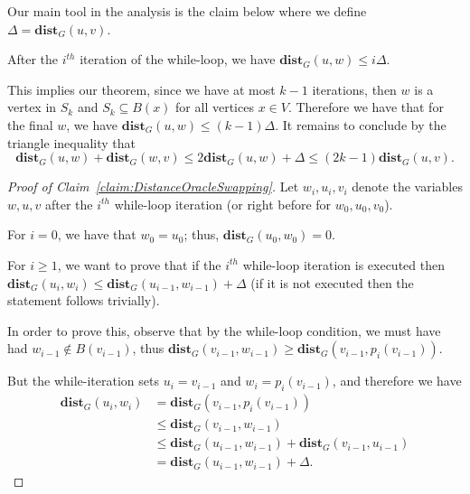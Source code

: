 Our main tool in the analysis is the claim below where we define $\Delta = \mathbf{dist}_G(u,v)$. 

\begin{claim}\label{claim:DistanceOracleSwapping} After the $i^{th}$ iteration of the while-loop, we have $\mathbf{dist}_G(u,w) \leq i\Delta$.
\end{claim}

This implies our theorem, since we have at most $k-1$ iterations, then $w$ is a vertex in $S_k$ and $S_k \subseteq B(x)$ for all vertices $x \in V$. Therefore we have that for the final $w$, we have $\mathbf{dist}_G(u,w) \leq (k-1)\Delta$. It remains to conclude by the triangle inequality that 
\[
\mathbf{dist}_G(u,w) + \mathbf{dist}_G(w,v) \leq 2\mathbf{dist}_G(u,w) + \Delta \leq (2k-1)\mathbf{dist}_G(u,v).
\]

\begin{proof}[Proof of Claim~\ref{claim:DistanceOracleSwapping}]
Let $w_i, u_i, v_i$ denote the variables $w,u,v$ after the $i^{th}$ while-loop iteration (or right before for $w_0,u_0,v_0$).

For $i = 0$, we have that $w_0 = u_0$; thus, $\mathbf{dist}_G(u_0,w_0) = 0$.

For $i \geq 1$, we want to prove that if the $i^{th}$ while-loop iteration is executed then $\mathbf{dist}_G(u_i,w_i) \leq \mathbf{dist}_G(u_{i-1},w_{i-1}) + \Delta$ (if it is not executed then the statement follows trivially).

In order to prove this, observe that by the while-loop condition, we must have had $w_{i-1} \not\in B(v_{i-1})$, thus  $\mathbf{dist}_G(v_{i-1}, w_{i-1}) \geq \mathbf{dist}_G(v_{i-1}, p_i(v_{i-1}))$.

But the while-iteration sets $u_i = v_{i-1}$ and $w_i = p_i(v_{i-1})$, and therefore we have
\begin{align*}
\mathbf{dist}_G(u_{i}, w_i) &= \mathbf{dist}_G(v_{i-1}, p_i(v_{i-1})) \\
&\leq
\mathbf{dist}_G(v_{i-1}, w_{i-1}) \\
&\leq \mathbf{dist}_G(u_{i-1}, w_{i-1}) + \mathbf{dist}_G(v_{i-1}, u_{i-1}) \\ &= \mathbf{dist}_G(u_{i-1}, w_{i-1}) + \Delta.
\end{align*}
\end{proof}